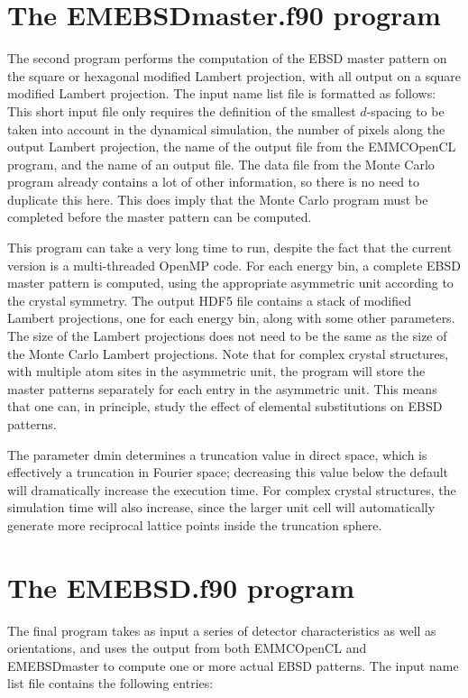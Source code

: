 \documentclass[DIV=calc, paper=letter, fontsize=11pt]{scrartcl}	 %
\begin{document}
\section{The \protect\textsf{EMEBSDmaster.f90} program\label{sec:f90EBSDmaster}}
The second program performs the computation of the EBSD master pattern on the
square or hexagonal modified Lambert projection, with all output on a square modified Lambert projection.
The input name list file is formatted as follows:
This short input file only requires the definition of the smallest $d$-spacing to be taken into account 
in the dynamical simulation, the number of pixels along the output Lambert projection, the name of the 
output file from the \textsf{EMMCOpenCL} program, and the name of an output file.  The data file from
the Monte Carlo program already contains a lot of other information, so there is no need to duplicate 
this here.  This does imply that the Monte Carlo program must be completed before the 
master pattern can be computed.

This program can take a very long time to run, despite the fact that the current version is a multi-threaded OpenMP code.
For each energy bin, a complete EBSD master pattern is computed, using the appropriate asymmetric unit according to
the crystal symmetry.  The output HDF5 file contains a stack of modified Lambert projections, one for each energy bin, along with 
some other parameters.  The size of the Lambert projections does not need to be the same as the size of the Monte Carlo
Lambert projections.  %
Note that for complex crystal structures,
with multiple atom sites in the asymmetric unit, the program will store the master patterns separately for each entry in the asymmetric unit.
This means that one can, in principle, study the effect of elemental substitutions on EBSD patterns.

The parameter \textsf{dmin} determines a truncation value in direct space, which is effectively a truncation in Fourier space; decreasing
this value below the default will dramatically increase the execution time.  For complex crystal structures, the simulation time will also
increase, since the larger unit cell will automatically generate more reciprocal lattice points inside the truncation sphere.

\section{The \protect\textsf{EMEBSD.f90} program\label{sec:f90EBSD}}
The final program takes as input a series of detector characteristics as well as orientations, and uses the output from both \textsf{EMMCOpenCL} and
\textsf{EMEBSDmaster} to compute one or more actual EBSD patterns.  
The input name list file contains the following entries:
\end{document}
